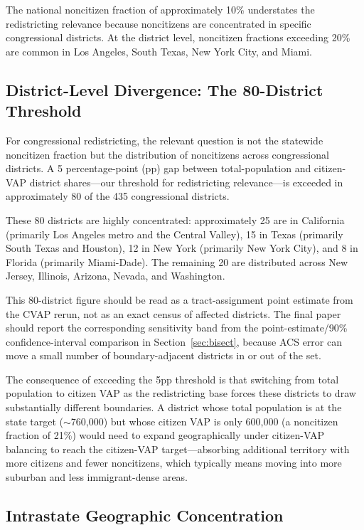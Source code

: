 The national noncitizen fraction of approximately 10\% understates the redistricting relevance because noncitizens are concentrated in specific congressional districts. At the district level, noncitizen fractions exceeding 20\% are common in Los Angeles, South Texas, New York City, and Miami.

\subsection{District-Level Divergence: The 80-District Threshold}

For congressional redistricting, the relevant question is not the statewide noncitizen fraction but the distribution of noncitizens across congressional districts. A 5 percentage-point (pp) gap between total-population and citizen-VAP district shares---our threshold for redistricting relevance---is exceeded in approximately 80 of the 435 congressional districts.

These 80 districts are highly concentrated: approximately 25 are in California (primarily Los Angeles metro and the Central Valley), 15 in Texas (primarily South Texas and Houston), 12 in New York (primarily New York City), and 8 in Florida (primarily Miami-Dade). The remaining 20 are distributed across New Jersey, Illinois, Arizona, Nevada, and Washington.

This 80-district figure should be read as a tract-assignment point estimate from the CVAP rerun, not as an exact census of affected districts. The final paper should report the corresponding sensitivity band from the point-estimate/90\% confidence-interval comparison in Section~\ref{sec:bisect}, because ACS error can move a small number of boundary-adjacent districts in or out of the set.

The consequence of exceeding the 5pp threshold is that switching from total population to citizen VAP as the redistricting base forces these districts to draw substantially different boundaries. A district whose total population is at the state target ($\sim$760,000) but whose citizen VAP is only 600,000 (a noncitizen fraction of 21\%) would need to expand geographically under citizen-VAP balancing to reach the citizen-VAP target---absorbing additional territory with more citizens and fewer noncitizens, which typically means moving into more suburban and less immigrant-dense areas.

\subsection{Intrastate Geographic Concentration}

